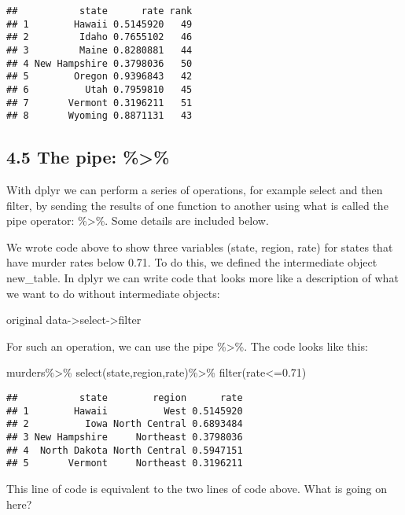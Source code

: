 \documentclass[
]{article}
\newenvironment{Shaded}{\begin{snugshade}}{\end{snugshade}}
\newcommand{\FloatTok}[1]{\textcolor[rgb]{0.00,0.00,0.81}{#1}}
\newcommand{\FunctionTok}[1]{\textcolor[rgb]{0.00,0.00,0.00}{#1}}
\newcommand{\NormalTok}[1]{#1}
\newcommand{\SpecialCharTok}[1]{\textcolor[rgb]{0.00,0.00,0.00}{#1}}
\begin{document}
\begin{verbatim}
##           state      rate rank
## 1        Hawaii 0.5145920   49
## 2         Idaho 0.7655102   46
## 3         Maine 0.8280881   44
## 4 New Hampshire 0.3798036   50
## 5        Oregon 0.9396843   42
## 6          Utah 0.7959810   45
## 7       Vermont 0.3196211   51
## 8       Wyoming 0.8871131   43
\end{verbatim}

\hypertarget{the-pipe}{%
\subsection{4.5 The pipe: \%\textgreater\%}\label{the-pipe}}

With dplyr we can perform a series of operations, for example select and
then filter, by sending the results of one function to another using
what is called the pipe operator: \%\textgreater\%. Some details are
included below.

We wrote code above to show three variables (state, region, rate) for
states that have murder rates below 0.71. To do this, we defined the
intermediate object new\_table. In dplyr we can write code that looks
more like a description of what we want to do without intermediate
objects:

original data-\textgreater select-\textgreater filter

For such an operation, we can use the pipe \%\textgreater\%. The code
looks like this:

\begin{Shaded}
\begin{Highlighting}[]
\NormalTok{murders}\SpecialCharTok{\%\textgreater{}\%} \FunctionTok{select}\NormalTok{(state,region,rate)}\SpecialCharTok{\%\textgreater{}\%} \FunctionTok{filter}\NormalTok{(rate}\SpecialCharTok{\textless{}=}\FloatTok{0.71}\NormalTok{)}
\end{Highlighting}
\end{Shaded}

\begin{verbatim}
##           state        region      rate
## 1        Hawaii          West 0.5145920
## 2          Iowa North Central 0.6893484
## 3 New Hampshire     Northeast 0.3798036
## 4  North Dakota North Central 0.5947151
## 5       Vermont     Northeast 0.3196211
\end{verbatim}

This line of code is equivalent to the two lines of code above. What is
going on here?
\end{document}
